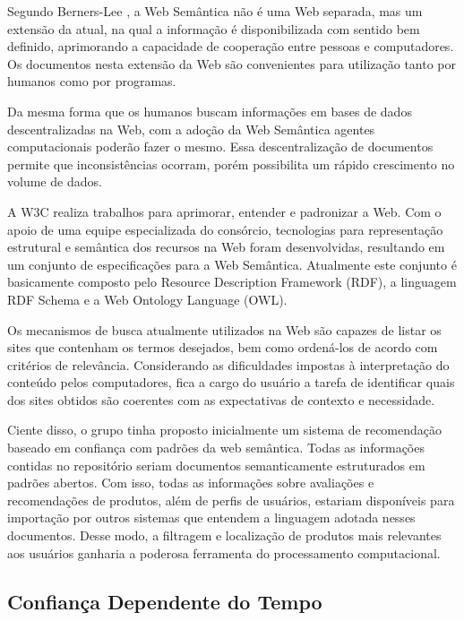  Segundo Berners-Lee \cite{bemerslee2001sw}, a Web Semântica não é uma Web separada, mas um extensão da atual, na qual a informação é disponibilizada com sentido bem definido, aprimorando a capacidade de cooperação entre pessoas e computadores. Os documentos nesta extensão da Web são convenientes para utilização tanto por humanos como por programas.

 Da mesma forma que os humanos buscam informações em bases de dados descentralizadas na Web, com a adoção da Web Semântica agentes computacionais poderão fazer o mesmo. Essa descentralização de documentos permite que inconsistências ocorram, porém possibilita um rápido crescimento no volume de dados.

 A W3C realiza trabalhos para aprimorar, entender e padronizar a Web. Com o apoio de uma equipe especializada do consórcio, tecnologias para representação estrutural e semântica dos recursos na Web foram desenvolvidas, resultando em um conjunto de especificações para a Web Semântica. Atualmente este conjunto é basicamente composto pelo Resource Description Framework (RDF), a linguagem RDF Schema e a Web Ontology Language (OWL).

 Os mecanismos de busca atualmente utilizados na Web são capazes de listar os sites que contenham os termos desejados, bem como ordená-los de acordo com critérios de relevância. Considerando as dificuldades impostas à interpretação do conteúdo pelos computadores, fica a cargo do usuário a tarefa de identificar quais dos sites obtidos são coerentes com as expectativas de contexto e necessidade.

 Ciente disso, o grupo tinha proposto inicialmente um sistema de recomendação baseado em confiança com padrões da web semântica. Todas as informações contidas no repositório seriam documentos semanticamente estruturados em padrões abertos. Com isso, todas as informações sobre avaliações e recomendações de produtos, além de perfis de usuários, estariam disponíveis para importação por outros sistemas que entendem a linguagem adotada nesses documentos. Desse modo, a filtragem e localização de produtos mais relevantes aos usuários ganharia a poderosa ferramenta do processamento computacional.


\subsection{Confiança Dependente do Tempo} %
\label{sub:confianca_dependente_do_tempo}

